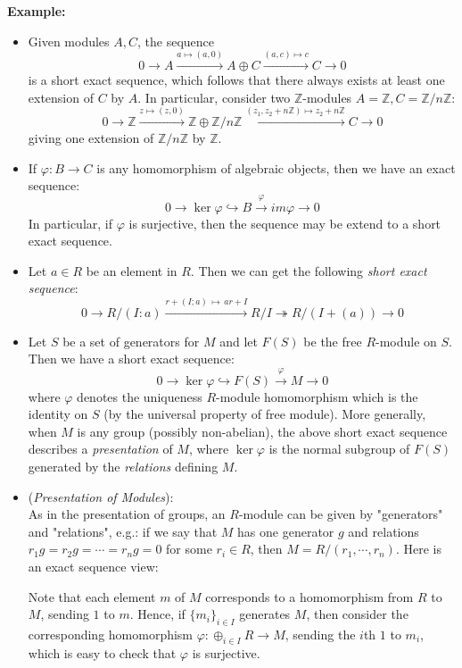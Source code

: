 \noindent\textbf{Example:} \begin{itemize}
    \item Given modules $A,C$, the sequence
    $$0 \to A \overset{a \mapsto (a,0)}{\longrightarrow} A \oplus C \overset{(a,c) \mapsto c}{\longrightarrow} C \to 0$$
    is a short exact sequence, which follows that there always exists at least one extension of $C$ by $A$. In particular, consider two $\mathbb{Z}$-modules $A=\mathbb{Z},C= \mathbb{Z}/n \mathbb{Z}$:
    $$0 \to \mathbb{Z} \overset{z \mapsto (z,0)}{\longrightarrow} \mathbb{Z} \oplus \mathbb{Z}/n\mathbb{Z} \overset{(z_1,z_2 + n\mathbb{Z}) \mapsto z_2 +n\mathbb{Z}}{\longrightarrow} C \to 0$$
    giving one extension of $\mathbb{Z}/n\mathbb{Z}$ by $\mathbb{Z}$.

    \item If $\varphi: B\to C$ is any homomorphism of algebraic objects, then we have an exact sequence:
    $$0 \to \ker \varphi \hookrightarrow B \overset{\varphi}{\to} im\varphi \to 0$$
    In particular, if $\varphi$ is surjective, then the sequence may be extend to a short exact sequence.
    
    \item Let $a \in R$ be an element in $R$. Then we can get the following \textit{short exact sequence}:
    $$0 \to R/(I:a) \overset{r+ (I;a) \,\mapsto\, ar+I}{\longrightarrow} R/I \twoheadrightarrow R/(I+(a)) \to 0$$

    \item Let $S$ be a set of generators for $M$ and let $F(S)$ be the free $R$-module on $S$. Then we have a short exact sequence:
    $$0 \to \ker \varphi \hookrightarrow F(S) \overset{\varphi}{\to} M \to 0$$
    where $\varphi$ denotes the uniqueness $R$-module homomorphism which is the identity on $S$ (by the universal property of free module). More generally, when $M$ is any group (possibly non-abelian), the above short exact sequence describes a \textit{presentation} of $M$, where $\ker \varphi$ is the normal subgroup of $F(S)$ generated by the \textit{relations} defining $M$.

    \item (\textit{Presentation of Modules}):\\
    As in the presentation of groups, an $R$-module can be given by  "generators" and "relations", e.g.: if we say that $M$ has one generator $g$ and relations $r_1g=r_2g= \cdots= r_ng =0$ for some $r_i \in R$, then $M = R/ (r_1,\cdots,r_n)$. Here is an exact sequence view:

    \noindent Note that each element $m$ of $M$ corresponds to a homomorphism from $R$ to $M$, sending $1$ to $m$. Hence, if $\{ m_i\}_{i \in I}$ generates $M$, then consider the corresponding homomorphism $\varphi: \oplus_{i \in I} R\to M$, sending the $i$th $1$ to $m_i$, which is easy to check that $\varphi$ is surjective.


\end{itemize}
